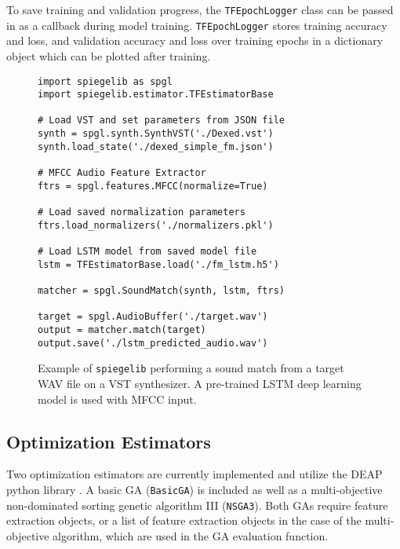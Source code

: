 To save training and validation progress, the \texttt{TFEpochLogger} class can be passed in as a callback during model training. \texttt{TFEpochLogger} stores training accuracy and loss, and validation accuracy and loss over training epochs in a dictionary object which can be plotted after training.

\begin{figure}[t]
\centering
\caption{Example of \texttt{spiegelib} performing a sound match from a target WAV file on a VST synthesizer. A pre-trained LSTM deep learning model is used with MFCC input.}
\footnotesize
\begin{verbatim}
import spiegelib as spgl
import spiegelib.estimator.TFEstimatorBase

# Load VST and set parameters from JSON file
synth = spgl.synth.SynthVST('./Dexed.vst')
synth.load_state('./dexed_simple_fm.json')

# MFCC Audio Feature Extractor
ftrs = spgl.features.MFCC(normalize=True)

# Load saved normalization parameters
ftrs.load_normalizers('./normalizers.pkl')

# Load LSTM model from saved model file
lstm = TFEstimatorBase.load('./fm_lstm.h5')

matcher = spgl.SoundMatch(synth, lstm, ftrs)

target = spgl.AudioBuffer('./target.wav')
output = matcher.match(target)
output.save('./lstm_predicted_audio.wav')
\end{verbatim}
\label{fig:lstm_code}
\end{figure} 

\subsection{Optimization Estimators}
Two optimization estimators are currently implemented and utilize the DEAP python library \cite{fortin2012deap}. A basic GA (\texttt{BasicGA}) is included as well as a multi-objective non-dominated sorting genetic algorithm III (\texttt{NSGA3}). Both GAs require feature extraction objects, or a list of feature extraction objects in the case of the multi-objective algorithm, which are used in the GA evaluation function. 

